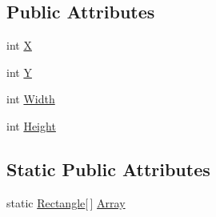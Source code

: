 \subsection*{Public Attributes}
\begin{DoxyCompactItemize}
\item 
int \hyperlink{struct_microsoft_1_1_xna_1_1_framework_1_1_rectangle_a45f8c4fd1ec5dc567a557cf0fe1c0a1c}{X}
\item 
int \hyperlink{struct_microsoft_1_1_xna_1_1_framework_1_1_rectangle_a465167d9286322d1bb01e958074251d9}{Y}
\item 
int \hyperlink{struct_microsoft_1_1_xna_1_1_framework_1_1_rectangle_aed20cd59b86979302494431453d40203}{Width}
\item 
int \hyperlink{struct_microsoft_1_1_xna_1_1_framework_1_1_rectangle_a309e422a7248af1f70ce6b1f7eeb48e7}{Height}
\end{DoxyCompactItemize}
\subsection*{Static Public Attributes}
\begin{DoxyCompactItemize}
\item 
static \hyperlink{struct_microsoft_1_1_xna_1_1_framework_1_1_rectangle}{Rectangle}\mbox{[}$\,$\mbox{]} \hyperlink{struct_microsoft_1_1_xna_1_1_framework_1_1_rectangle_a8b92de89d83120a48d385f0af8888154}{Array}
\end{DoxyCompactItemize}
